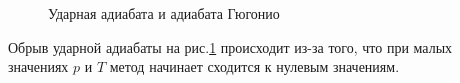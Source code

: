 \documentclass[12pt]{article}
\begin{document}
\begin{figure}[H]
\caption{Ударная адиабата и адиабата Гюгонио}
\label{deflagrationpic}
\end{figure}

Обрыв ударной адиабаты на рис.\ref{deflagrationpic} происходит из-за того, что при малых значениях $p$ и $T$ метод начинает сходится к нулевым значениям.
\end{document}
